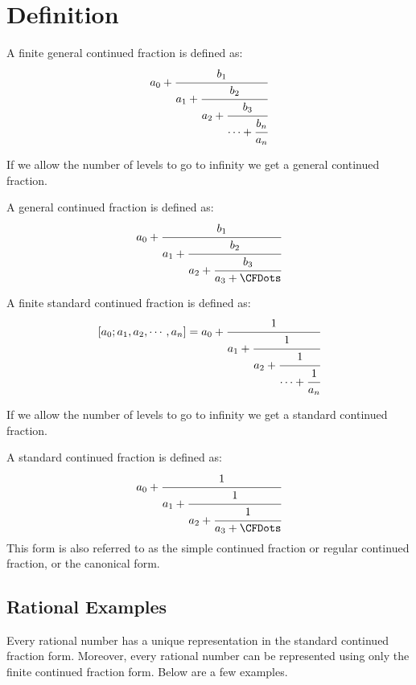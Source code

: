 \documentclass[a4paper]{article}
\begin{document}
    \section{Definition}\label{sec:definition}

    \begin{definition}
        \label{def_finite_gen_c_fract}
        A finite general continued fraction is defined as:
        \[
            a_0 +
            \cfrac{b_1}{a_1+\cfrac{b_2}{a_2 +\cfrac{b_3}{\cdots + \cfrac{b_n}{a_n} }}}
        \]
    \end{definition}

    If we allow the number of levels to go to infinity we get a general continued fraction.

    \begin{definition}
        \label{def_gen_c_fract}
        A general continued fraction is defined as:
        \[
            a_0 +
            \cfrac{b_1}{a_1+\cfrac{b_2}{a_2 +\cfrac{b_3}{a_3 +
            \CFDots}}}
        \]
    \end{definition}

    \begin{definition}
        \label{def_finite_c_fract}
        A finite standard continued fraction is defined as:
        \[
            [a_0;a_1, a_2, \cdots, a_n] = a_0 +
            \cfrac{1}{a_1+\cfrac{1}{a_2 +\cfrac{1}{\cdots + \cfrac{1}{a_n}}}}
        \]
    \end{definition}

    If we allow the number of levels to go to infinity we get a standard continued fraction.

    \begin{definition}
        \label{def_c_fract}
        A standard continued fraction is defined as:
        \[
            a_0 +
            \cfrac{1}{a_1+\cfrac{1}{a_2 +\cfrac{1}{a_3 + \CFDots}}}
        \]
        This form is also referred to as the simple continued fraction or regular continued fraction, or the canonical form.
    \end{definition}

    \subsection{Rational Examples}\label{subsec:rational-examples}
    Every rational number has a unique representation in the standard continued fraction form.
    Moreover, every rational number can be represented using only the finite continued fraction form.
    Below are a few examples.
\end{document}
